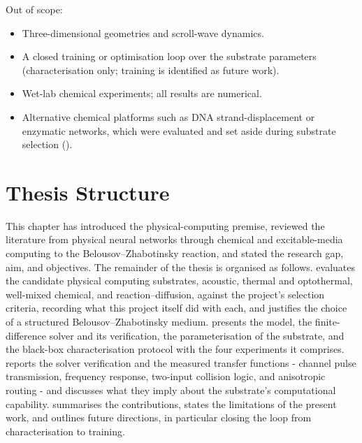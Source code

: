Out of scope:
\begin{itemize}
    \item Three-dimensional geometries and scroll-wave dynamics.
    \item A closed training or optimisation loop over the substrate parameters (characterisation only; training is identified as future work).
    \item Wet-lab chemical experiments; all results are numerical.
    \item Alternative chemical platforms such as DNA strand-displacement or enzymatic networks, which were evaluated and set aside during substrate selection ().
\end{itemize}

\section{Thesis Structure}
\label{sec:structure}

This chapter has introduced the physical-computing premise, reviewed the literature from physical neural networks through chemical and excitable-media computing to the Belousov--Zhabotinsky reaction, and stated the research gap, aim, and objectives. 
The remainder of the thesis is organised as follows. 
 evaluates the candidate physical computing substrates, acoustic, thermal and optothermal, well-mixed chemical, and reaction--diffusion, against the project's selection criteria, recording what this project itself did with each, and justifies the choice of a structured Belousov--Zhabotinsky medium. 
 presents the model, the finite-difference solver and its verification, the parameterisation of the substrate, and the black-box characterisation protocol with the four experiments it comprises. 
 reports the solver verification and the measured transfer functions - channel pulse transmission, frequency response, two-input collision logic, and anisotropic routing - and discusses what they imply about the substrate's computational capability. 
 summarises the contributions, states the limitations of the present work, and outlines future directions, in particular closing the loop from characterisation to training.
